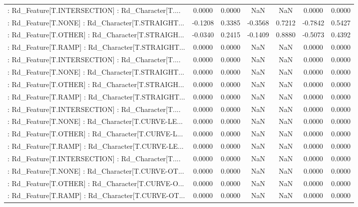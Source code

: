 \begin{longtable}{p{4cm}cccccc}
 : Rd\_Feature[T.INTERSECTION] : Rd\_Character[T.... &  0.0000 &    0.0000 &     NaN &          NaN &  0.0000 &  0.0000 \\
 : Rd\_Feature[T.NONE] : Rd\_Character[T.STRAIGHT... & -0.1208 &    0.3385 & -0.3568 &       0.7212 & -0.7842 &  0.5427 \\
 : Rd\_Feature[T.OTHER] : Rd\_Character[T.STRAIGH... & -0.0340 &    0.2415 & -0.1409 &       0.8880 & -0.5073 &  0.4392 \\
 : Rd\_Feature[T.RAMP] : Rd\_Character[T.STRAIGHT... &  0.0000 &    0.0000 &     NaN &          NaN &  0.0000 &  0.0000 \\
 : Rd\_Feature[T.INTERSECTION] : Rd\_Character[T.... &  0.0000 &    0.0000 &     NaN &          NaN &  0.0000 &  0.0000 \\
 : Rd\_Feature[T.NONE] : Rd\_Character[T.STRAIGHT... &  0.0000 &    0.0000 &     NaN &          NaN &  0.0000 &  0.0000 \\
 : Rd\_Feature[T.OTHER] : Rd\_Character[T.STRAIGH... &  0.0000 &    0.0000 &     NaN &          NaN &  0.0000 &  0.0000 \\
 : Rd\_Feature[T.RAMP] : Rd\_Character[T.STRAIGHT... &  0.0000 &    0.0000 &     NaN &          NaN &  0.0000 &  0.0000 \\
 : Rd\_Feature[T.INTERSECTION] : Rd\_Character[T.... &  0.0000 &    0.0000 &     NaN &          NaN &  0.0000 &  0.0000 \\
 : Rd\_Feature[T.NONE] : Rd\_Character[T.CURVE-LE... &  0.0000 &    0.0000 &     NaN &          NaN &  0.0000 &  0.0000 \\
 : Rd\_Feature[T.OTHER] : Rd\_Character[T.CURVE-L... &  0.0000 &    0.0000 &     NaN &          NaN &  0.0000 &  0.0000 \\
 : Rd\_Feature[T.RAMP] : Rd\_Character[T.CURVE-LE... &  0.0000 &    0.0000 &     NaN &          NaN &  0.0000 &  0.0000 \\
 : Rd\_Feature[T.INTERSECTION] : Rd\_Character[T.... &  0.0000 &    0.0000 &     NaN &          NaN &  0.0000 &  0.0000 \\
 : Rd\_Feature[T.NONE] : Rd\_Character[T.CURVE-OT... &  0.0000 &    0.0000 &     NaN &          NaN &  0.0000 &  0.0000 \\
 : Rd\_Feature[T.OTHER] : Rd\_Character[T.CURVE-O... &  0.0000 &    0.0000 &     NaN &          NaN &  0.0000 &  0.0000 \\
 : Rd\_Feature[T.RAMP] : Rd\_Character[T.CURVE-OT... &  0.0000 &    0.0000 &     NaN &          NaN &  0.0000 &  0.0000 \\

\end{longtable}

